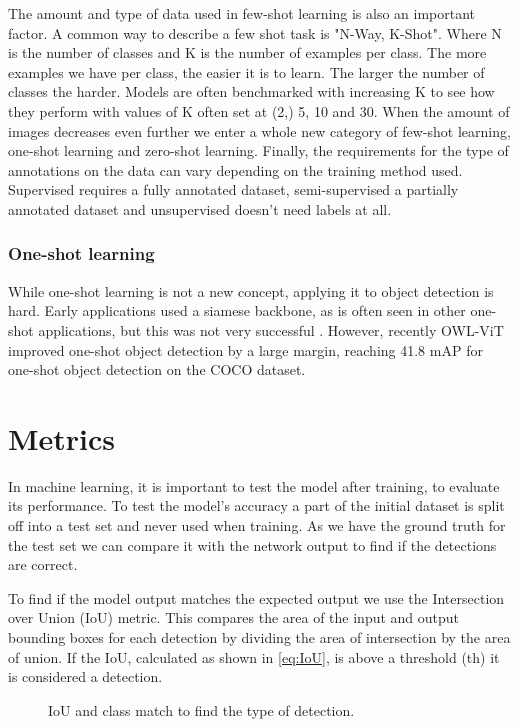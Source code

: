 The amount and type of data used in few-shot learning is also an important factor. A common way to describe a few shot task is "N-Way, K-Shot". Where N is the number of classes and K is the number of examples per class. The more examples we have per class, the easier it is to learn. The larger the number of classes the harder. Models are often benchmarked with increasing K to see how they perform with values of K often set at (2,) 5, 10 and 30. When the amount of images decreases even further we enter a whole new category of few-shot learning, one-shot learning and zero-shot learning. Finally, the requirements for the type of annotations on the data can vary depending on the training method used. Supervised requires a fully annotated dataset, semi-supervised a partially annotated dataset and unsupervised doesn't need labels at all.

\subsubsection*{One-shot learning}

While one-shot learning is not a new concept, applying it to object detection is hard. Early applications used a siamese backbone, as is often seen in other one-shot applications, but this was not very successful \citep{One-shot-siamese}. However, recently OWL-ViT \citep{owlvit} improved one-shot object detection by a large margin, reaching 41.8 mAP for one-shot object detection on the COCO dataset.


\section{Metrics}
In machine learning, it is important to test the model after training, to evaluate its performance. To test the model's accuracy a part of the initial dataset is split off into a test set and never used when training. As we have the ground truth for the test set we can compare it with the network output to find if the detections are correct. 

To find if the model output matches the expected output we use the Intersection over Union (IoU) metric. This compares the area of the input and output bounding boxes for each detection by dividing the area of intersection by the area of union. If the IoU, calculated as shown in \ref{eq:IoU}, is above a threshold (th) it is considered a detection.

\begin{figure}[h]
	\centering
	
	\caption{\label{fig:2_IoU_det} IoU and class match to find the type of detection.}
\end{figure}

